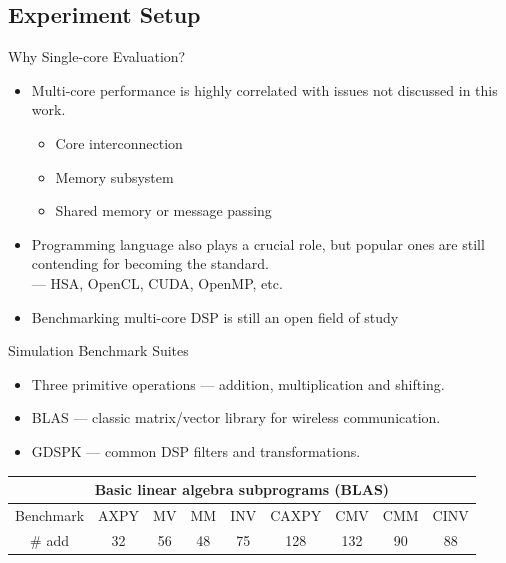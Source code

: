 \documentclass{beamer}
\begin{document}
\begin{CJK}{UTF8}{bkai}
    \subsection{Experiment Setup}
    \begin{frame}{Why Single-core Evaluation?}
        \begin{itemize}
            \item Multi-core performance is highly correlated with issues not discussed in this work.
                \begin{itemize}
                    \item Core interconnection
                    \item Memory subsystem 
                    \item Shared memory or message passing
                \end{itemize}
            \item Programming language also plays a crucial role, but popular ones are still contending for becoming the standard. \\
                --- HSA, OpenCL, CUDA, OpenMP, etc.
            \item Benchmarking multi-core DSP is still an open field of study~\cite{landscape}
        \end{itemize}       
    \end{frame}
    \begin{frame}{Simulation Benchmark Suites}
        \begin{itemize}
            \item Three primitive operations --- addition, multiplication and shifting.
            \item BLAS --- classic matrix/vector library for wireless communication.
            \item GDSPK --- common DSP filters and transformations.
        \end{itemize}
        \begin{table}[!ht]
            \centering
            \resizebox{\columnwidth}{!}
            {
                \begin{tabular}{|c|c|c|c|c|c|c|c|c|}
                    \hline
                    \multicolumn{9}{|c|}{\textbf{Basic linear algebra subprograms (BLAS)}} \\ \hline
                    Benchmark              & AXPY   & MV     & MM      & INV      & CAXPY  & CMV  & CMM    & CINV  \\ \hline
                    \# add            &  32    &  56    &   48    &    75    &  128   & 132  &   90   &  88   \\ \hline

\end{tabular}}
\end{table}
\end{frame}
\end{CJK}
\end{document}
